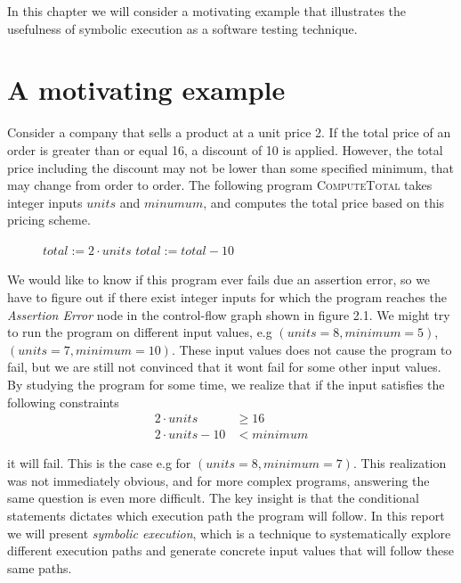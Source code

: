 In this chapter  we will consider a motivating example that illustrates the usefulness of symbolic execution as a software testing technique.

\section{A motivating example}
Consider a company that sells a product at a unit price 2. If the total price of an order is greater than or equal 16, a discount of 10 is applied. However, the total price including the discount may not be lower than some specified minimum, that may change from order to order. The following program \textsc{ComputeTotal} takes integer inputs $units$ and $minumum$, and computes the total price based on this pricing scheme.
\begin{figure}[!h]
	\begin{algorithmic}[1]
		\State $total := 2\cdot units$
		\State $total := total - 10$
		\EndIf
		\State {}
		\EndProcedure
	\end{algorithmic}
\end{figure}

\motexample

\newpage

We would like to know if this program ever fails due an assertion error, so we have to figure out if there exist integer inputs for which the program reaches the \textsl{Assertion Error} node in the control-flow graph shown in figure 2.1.
We might try to run the program on different input values, e.g $(units = 8, minimum = 5)$, $(units = 7, minimum = 10)$. These input values does not cause the program to fail, but we are still not convinced that it wont fail for some other input values.
By studying the program for some time, we realize that if the input satisfies the following constraints
\begin{align*}
	 2\cdot units  & \geq 16\\
	 2 \cdot units - 10 & < minimum
\end{align*}

it will fail. This is the case e.g for $(units = 8, minimum = 7)$. This realization was not immediately obvious, and for more complex programs, answering the same question is even more difficult. The key insight is that the conditional statements dictates which execution path the program will follow. In this report we will present \emph{symbolic execution}, which is a technique to systematically explore different execution paths and generate concrete input values that will follow these same paths. 